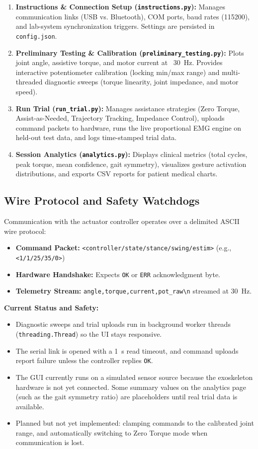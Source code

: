 \documentclass[11pt,a4paper]{article}
\begin{document}
\begin{enumerate}
    \item \textbf{Instructions \& Connection Setup (\texttt{instructions.py}):} Manages communication links (USB vs. Bluetooth), COM ports, baud rates (115200), and lab-system synchronization triggers. Settings are persisted in \texttt{config.json}.
    \item \textbf{Preliminary Testing \& Calibration (\texttt{preliminary\_testing.py}):} Plots joint angle, assistive torque, and motor current at ~30~Hz. Provides interactive potentiometer calibration (locking min/max range) and multi-threaded diagnostic sweeps (torque linearity, joint impedance, and motor speed).
    \item \textbf{Run Trial (\texttt{run\_trial.py}):} Manages assistance strategies (Zero Torque, Assist-as-Needed, Trajectory Tracking, Impedance Control), uploads command packets to hardware, runs the live proportional EMG engine on held-out test data, and logs time-stamped trial data.
    \item \textbf{Session Analytics (\texttt{analytics.py}):} Displays clinical metrics (total cycles, peak torque, mean confidence, gait symmetry), visualizes gesture activation distributions, and exports CSV reports for patient medical charts.
\end{enumerate}

\subsection{Wire Protocol and Safety Watchdogs}
Communication with the actuator controller operates over a delimited ASCII wire protocol:
\begin{itemize}
    \item \textbf{Command Packet:} \texttt{<controller/state/stance/swing/estim>} (e.g., \texttt{<1/1/25/35/0>})
    \item \textbf{Hardware Handshake:} Expects \texttt{OK} or \texttt{ERR} acknowledgment byte.
    \item \textbf{Telemetry Stream:} \texttt{angle,torque,current,pot\_raw\textbackslash n} streamed at 30~Hz.
\end{itemize}

\textbf{Current Status and Safety:}
\begin{itemize}
    \item Diagnostic sweeps and trial uploads run in background worker threads (\texttt{threading.Thread}) so the UI stays responsive.
    \item The serial link is opened with a 1~s read timeout, and command uploads report failure unless the controller replies \texttt{OK}.
    \item The GUI currently runs on a simulated sensor source because the exoskeleton hardware is not yet connected. Some summary values on the analytics page (such as the gait symmetry ratio) are placeholders until real trial data is available.
    \item Planned but not yet implemented: clamping commands to the calibrated joint range, and automatically switching to Zero Torque mode when communication is lost.
\end{itemize}
\end{document}

